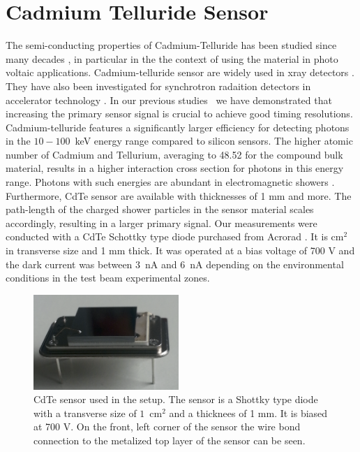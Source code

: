 %
%
%
\section{Cadmium Telluride Sensor}
\label{sec:siliconpad}
The semi-conducting properties of Cadmium-Telluride has been studied since many decades \cite{cdtegeneric}, 
in particular in the the context of using the material in photo voltaic applications.
Cadmium-telluride sensor are widely used in xray detectors \cite{cdtesensorsgeneric,cdtesensors2,cdtesensors3}. 
They have also been investigated for synchrotron radaition detectors in accelerator technology \cite{cdtelhc}.   
In our previous 
studies~\cite{Anderson:2015gha,MCPShowerMaxPaper,Ronzhin201552,SiliconTiming,PixelatedMCP,Anderson:2016ygg,Anderson:2015tia} 
we have demonstrated that increasing the primary sensor signal is crucial to achieve good timing resolutions.  
Cadmium-telluride features a significantly larger efficiency for detecting photons in the $10-100$~keV energy range 
compared to silicon sensors. The higher atomic number of Cadmium and Tellurium, averaging to 48.52 for the compound bulk material, results in a higher interaction cross section for photons in this energy range. 
Photons with such energies are abundant in electromagnetic showers \cite{showercomposition}. 
Furthermore, CdTe sensor are available with thicknesses of 1 mm and more. 
The path-length of the charged shower particles in the sensor material scales accordingly, 
resulting in a larger primary signal.
%
Our measurements were conducted with a CdTe Schottky type diode purchased from Acrorad \cite{acrorad}. 
It is $\mathrm{cm}^{2}$ in transverse size and 1 mm thick.
It was operated at a bias voltage of 700 V and the dark current was between $3$~nA 
and $6$~nA depending on the environmental conditions in the test beam experimental 
zones.     
%
\begin{figure}[htbp] 
\centering
\includegraphics[width=0.49\textwidth]{figures/CdTeSensor.png} 
\caption{CdTe sensor used in the setup. The sensor is a Shottky type diode with a transverse size 
of $1$~$\mathrm{cm}^{2}$ and a thicknees of 1 mm. It is biased at 700 V. 
On the front, left corner of the sensor the wire bond connection 
to the metalized top layer of the sensor can be seen.} 
\label{fig:CdTeSensor} 
\end{figure} 
